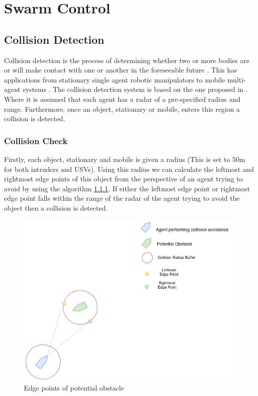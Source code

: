 \documentclass[bsc,frontabs,twoside,singlespacing,parskip,deptreport]{infthesis}     %
\begin{document}
\section{Swarm Control}
\label{sec:control}
\subsection{Collision Detection}
\label{ss:collision}
Collision detection is the process of determining whether two or more bodies are or will make contact with one or another in the foreseeable future \cite{4414258}.  This has applications from stationary single agent robotic manipulators \cite{galabally2018collision} \cite{6987848} to mobile multi-agent systems \cite{marzoughi2018collision}\cite{van2011reciprocal}. 
The collision detection system is based on the one proposed in \cite{raboin2013model}. Where it is assumed that each agent has a radar of a pre-specified radius and range. Furthermore, once an object, stationary or mobile, enters this region a collision is detected. 

\subsubsection{Collision Check}
Firstly, each object, stationary and mobile is given a radius (This is set to 50m for both intruders and USVs). Using this radius we can calculate the leftmost and rightmost edge points of this object from the perspective of an agent trying to avoid by using the algorithm \ref{}. If either the leftmost edge point or rightmost edge point falls within the range of the radar of the agent trying to avoid the object then a collision is detected.


\begin{figure}
    \centering
    \includegraphics[width=0.8\linewidth]{report/images/edge_points.png}
    \caption{Edge points of potential obstacle}
    \label{fig:edge}
\end{figure}
\end{document}
